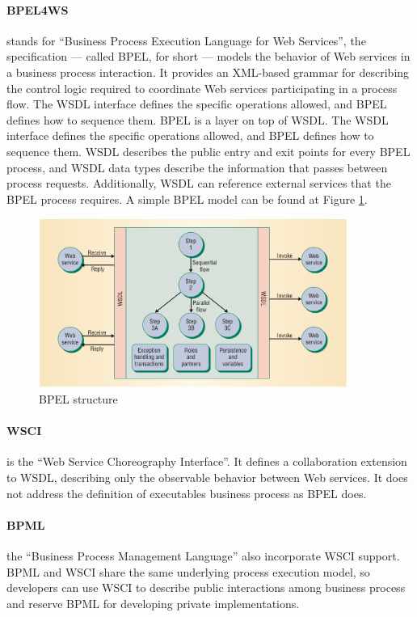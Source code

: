 \paragraph{BPEL4WS} 
stands for ``Business Process Execution Language for Web Services'', the specification — called BPEL, for short — models the behavior of Web services in a business process interaction. It provides an XML-based grammar for describing the control logic required to coordinate Web services participating in a process flow. The WSDL interface defines the specific operations allowed, and BPEL defines how to sequence them. BPEL is a layer on top of WSDL. The WSDL interface defines the specific operations allowed, and BPEL defines how to sequence them. WSDL describes the public entry and exit points for every BPEL process, and WSDL data types describe the information that passes between process requests. Additionally, WSDL can reference external services that the BPEL process requires. A simple BPEL model can be found at Figure \ref{BPELstructure}.

\begin{figure}[htb]
  \centering
  \includegraphics[width=0.9\textwidth]{images/BPELstructure}
  \caption{BPEL structure}
  \label{BPELstructure}
\end{figure}

\paragraph{WSCI}
is the ``Web Service Choreography Interface''. It defines a collaboration extension to WSDL, describing only the observable behavior between Web services. It does not address the definition of executables business process as BPEL does.

\paragraph{BPML} 
the ``Business Process Management Language'' also incorporate WSCI support. BPML and WSCI share the same underlying process execution model, so developers can use WSCI to describe public interactions among business process and reserve BPML for developing private implementations.

